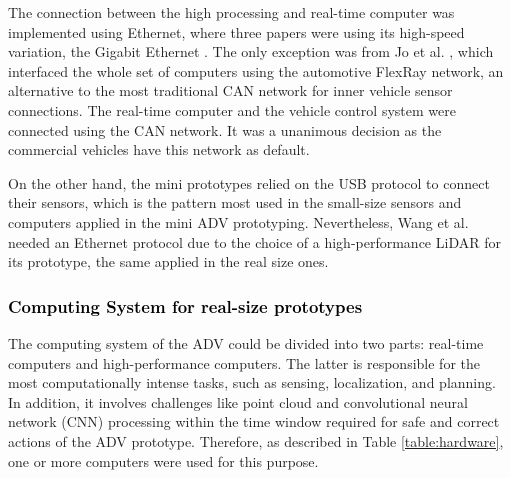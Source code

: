 \documentclass[lettersize,journal]{IEEEtran}
\begin{document}
\color{black}
The connection between the high processing and real-time computer was implemented using Ethernet, where three papers were using its high-speed variation, the Gigabit Ethernet \cite{Tang2018,Kessler2019,9359043}. The only exception was from Jo et al. \cite{Jo2015}, which interfaced the whole set of computers using the automotive FlexRay network, an alternative to the most traditional CAN network for inner vehicle sensor connections. The real-time computer and the vehicle control system were connected using the CAN network. It was a unanimous decision as the commercial vehicles have this network as default.

On the other hand, the mini prototypes relied on the USB protocol to connect their sensors, which is the pattern most used in the small-size sensors and computers applied in the mini ADV prototyping. Nevertheless, Wang et al. \cite{Wang2019} needed an Ethernet protocol due to the choice of a high-performance LiDAR for its prototype, the same applied in the real size ones.

\vspace{\baselineskip}

\subsubsection {\textcolor{black}{\textbf{Computing System for real-size prototypes}}}

\leavevmode\vspace{0.1\baselineskip}%

The computing system of the ADV could be divided into two parts: real-time computers and high-performance computers. The latter is responsible for the most computationally intense tasks, such as sensing, localization, and planning. In addition, it involves challenges like point cloud and convolutional neural network (CNN) processing within the time window required for safe and correct actions of the ADV prototype. Therefore, as described in Table \ref{table:hardware}, one or more computers were used for this purpose. 
\end{document}
